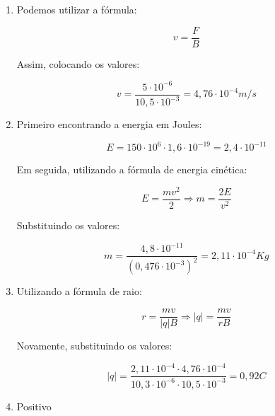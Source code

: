 \item 

\begin{enumerate}
\item 
Podemos utilizar a fórmula:

$$
v = \frac{F}{B}
$$

Assim, colocando os valores:

$$
v = \frac{5 \cdot 10^{-6}}{10,5 \cdot 10^{-3}} = 4,76 \cdot 10^{-4} m/s
$$

\item
Primeiro encontrando a energia em Joules:

$$
E = 150 \cdot 10^{6} \cdot 1,6 \cdot 10^{-19} = 2,4 \cdot 10^{-11}
$$

Em seguida, utilizando a fórmula de energia cinética:

$$
E = \frac{mv^2}{2} \Rightarrow m = \frac{2E}{v^2}
$$

Substituindo os valores:

$$
m = \frac{4,8 \cdot 10^{-11}}{(0,476 \cdot 10^{-3})^2} = 2,11 \cdot 10^{-4} Kg
$$

\item
Utilizando a fórmula de raio:

$$
r = \frac{mv}{|q|B} \Rightarrow |q| = \frac{mv}{rB}
$$

Novamente, substituindo os valores:

$$
|q| = \frac{2,11 \cdot 10^{-4} \cdot 4,76 \cdot 10^{-4}}
{10,3 \cdot 10^{-6} \cdot 10,5 \cdot 10^{-3}}
= 0,92C
$$

\item
Positivo
\end{enumerate}